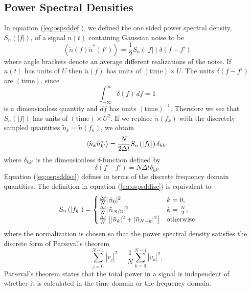 \subsection{Power Spectral Densities}
\label{ss:psdconv}

In equation (\ref{eq:ospsddef}), we defined the one sided power spectral
density, $S_n(|f|)$, of a signal $n(t)$ containing Gaussian noise to be 
\begin{equation}
\left\langle\tilde{n}(f) \tilde{n}^\ast(f')\right\rangle = 
\frac{1}{2}S_n(|f|)\delta(f-f')
\end{equation}
where angle brackets denote an average different realizations of the noise.
If $n(t)$ has units of $U$ then $\tilde{n}(f)$ has units of
$(\mathrm{time}) \times U$. The units $\delta(f-f')$ are $(\mathrm{time})$,
since 
\begin{equation}
\int_{-\infty}^\infty \delta(f)\,df = 1
\end{equation}
is a dimensionless quantity and $df$ has units $(\mathrm{time})^{-1}$.
Therefore we see that $S_n(|f|)$ has units of $(\mathrm{time})\times U^2$.
If we replace $\tilde{n}(f_k)$ with the discretely sampled quantities 
$\tilde{n}_k = \tilde{n}(f_k)$, we obtain
\begin{equation}
\left\langle\tilde{n}_k \tilde{n}_{k'}^\ast\right\rangle = 
\frac{N}{2\Delta t}S_n\left(\left|f_{k}\right|\right)\delta_{kk'}
\label{eq:ospsddisc}
\end{equation}
where $\delta_{kk'}$ is the dimensionless $\delta$-function defined by
\begin{equation}
\delta(f-f') = N\Delta t\delta_{kk'}
\end{equation}
Equation (\ref{eq:ospsddisc}) defines \ospsd in terms of the discrete
frequency domain quantities.  The definition in equation (\ref{eq:ospsddisc}) is
equivalent to
\begin{equation}
S_n\left(\left|f_{k}\right|\right) =
\begin{cases}
\frac{\Delta t}{N} | \tilde{n}_0 |^2 & k = 0, \\
\frac{\Delta t}{N} | \tilde{n}_{N/2} |^2 & k = \frac{N}{2}, \\
\frac{\Delta t}{N} \left[ | \tilde{n}_k |^2 + | \tilde{n}_{N-k} |^2 \right] & \text{otherwise}
\end{cases}
\end{equation}
where the normalization is chosen so that the power spectral
density satisfies the discrete form of Parseval's theorem
\begin{equation}
\sum_{j=0}^{N-1} |v_j|^2 = \frac{1}{N} \sum_{k=0}^{N-1} |\tilde{v}_k|^2,
\end{equation}
Parseval's theorem states that the total power in a signal is independent of
whether it is calculated in the time domain or the frequency domain.

